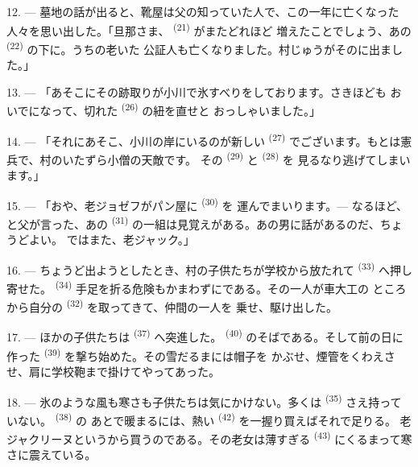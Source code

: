 12. --- 墓地の話が出ると、靴屋は父の知っていた人で、この一年に亡くなった
人々を思い出した。「旦那さま、 \textsuperscript{(21)} がまたどれほど
増えたことでしょう、あの \textsuperscript{(22)} の下に。うちの老いた
公証人も亡くなりました。村じゅうがそのに出ました。」

13. --- 「あそこにその跡取りが小川で氷すべりをしております。さきほども
おいでになって、切れた \textsuperscript{(26)} の紐を直せと
おっしゃいました。」

14. --- 「それにあそこ、小川の岸にいるのが新しい
\textsuperscript{(27)} でございます。もとは憲兵で、村のいたずら小僧の天敵です。
その \textsuperscript{(29)} と \textsuperscript{(28)} を
見るなり逃げてしまいます。」

15. --- 「おや、老ジョゼフがパン屋に \textsuperscript{(30)} を
運んでまいります。--- なるほど、と父が言った、あの
\textsuperscript{(31)} の一組は見覚えがある。あの男に話があるのだ、ちょうどよい。
ではまた、老ジャック。」

16. --- ちょうど出ようとしたとき、村の子供たちが学校から放たれて
 \textsuperscript{(33)} へ押し寄せた。
\textsuperscript{(34)} 手足を折る危険もかまわずにである。その一人が車大工の
ところから自分の \textsuperscript{(32)} を取ってきて、仲間の一人を
乗せ、駆け出した。

17. --- ほかの子供たちは \textsuperscript{(37)} へ突進した。
 \textsuperscript{(40)} のそばである。そして前の日に作った
 \textsuperscript{(39)} を撃ち始めた。その雪だるまには帽子を
かぶせ、煙管をくわえさせ、肩に学校鞄まで掛けてやってあった。

18. --- 氷のような風も寒さも子供たちは気にかけない。多くは
\textsuperscript{(35)} さえ持っていない。 \textsuperscript{(38)} の
あとで暖まるには、熱い \textsuperscript{(42)} を一握り買えばそれで足りる。
老ジャクリーヌというから買うのである。その老女は薄すぎる
 \textsuperscript{(43)} にくるまって寒さに震えている。

\VUsaut{3.0mm}
\VUsaut{3.0mm}

\VUsaut{4.0mm}

